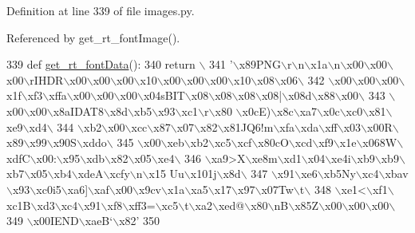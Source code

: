 Definition at line 339 of file images.\+py.



Referenced by get\+\_\+rt\+\_\+font\+Image().


\begin{DoxyCode}
339 \textcolor{keyword}{def }\hyperlink{namespaceimages_a1b911d4fa04b4af968ec1adc8d82e9f1}{get\_rt\_fontData}():
340     \textcolor{keywordflow}{return} \(\backslash\)
341 \textcolor{stringliteral}{'\(\backslash\)x89PNG\(\backslash\)r\(\backslash\)n\(\backslash\)x1a\(\backslash\)n\(\backslash\)x00\(\backslash\)x00\(\backslash\)x00\(\backslash\)rIHDR\(\backslash\)x00\(\backslash\)x00\(\backslash\)x00\(\backslash\)x10\(\backslash\)x00\(\backslash\)x00\(\backslash\)x00\(\backslash\)x10\(\backslash\)x08\(\backslash\)x06\(\backslash\)}
342 \textcolor{stringliteral}{\(\backslash\)x00\(\backslash\)x00\(\backslash\)x00\(\backslash\)x1f\(\backslash\)xf3\(\backslash\)xffa\(\backslash\)x00\(\backslash\)x00\(\backslash\)x00\(\backslash\)x04sBIT\(\backslash\)x08\(\backslash\)x08\(\backslash\)x08\(\backslash\)x08|\(\backslash\)x08d\(\backslash\)x88\(\backslash\)x00\(\backslash\)}
343 \textcolor{stringliteral}{\(\backslash\)x00\(\backslash\)x00\(\backslash\)x8aIDAT8\(\backslash\)x8d\(\backslash\)xb5\(\backslash\)x93\(\backslash\)xc1\(\backslash\)r\(\backslash\)x80 \(\backslash\)x0cE)\(\backslash\)x8c\(\backslash\)xa7\(\backslash\)x0c\(\backslash\)xc0\(\backslash\)x81\(\backslash\)xe9\(\backslash\)xd4\(\backslash\)}
344 \textcolor{stringliteral}{\(\backslash\)xb2\(\backslash\)x00\(\backslash\)xcc\(\backslash\)x87\(\backslash\)x07\(\backslash\)x82\(\backslash\)x81JQ$6!$m\(\backslash\)xfa\(\backslash\)xda\(\backslash\)xff\(\backslash\)x03\(\backslash\)x00R\(\backslash\)x89\(\backslash\)x99\(\backslash\)x90S\(\backslash\)xddo\(\backslash\)}
345 \textcolor{stringliteral}{\(\backslash\)x00\(\backslash\)xeb\(\backslash\)xb2\(\backslash\)xc5\(\backslash\)xcf\(\backslash\)x80cO\(\backslash\)xcd\(\backslash\)xf9\(\backslash\)x1e\(\backslash\)x068W\(\backslash\)xdfC\(\backslash\)x00:\(\backslash\)x95\(\backslash\)xdb\(\backslash\)x82\(\backslash\)x05\(\backslash\)xe4\(\backslash\)}
346 \textcolor{stringliteral}{\(\backslash\)xa9>X\(\backslash\)xe8m\(\backslash\)xd1\(\backslash\)x04\(\backslash\)xe4i\(\backslash\)xb9\(\backslash\)xb9\(\backslash\)xb7\(\backslash\)x05\(\backslash\)xb4\(\backslash\)xdeA\(\backslash\)xcfy\(\backslash\)n\(\backslash\)x15 Uu\(\backslash\)x101j\(\backslash\)x8d\(\backslash\)}
347 \textcolor{stringliteral}{\(\backslash\)x91\(\backslash\)xe6\(\backslash\)xb5Ny\(\backslash\)xc4\(\backslash\)xbav\(\backslash\)x93\(\backslash\)xc0i5\(\backslash\)xa6]\(\backslash\)xaf\(\backslash\)x00\(\backslash\)x9cv\(\backslash\)x1a\(\backslash\)xa5\(\backslash\)x17\(\backslash\)x97\(\backslash\)x07Tw\(\backslash\)t\(\backslash\)}
348 \textcolor{stringliteral}{\(\backslash\)xe1<\(\backslash\)xf1\(\backslash\)xc1B\(\backslash\)xd3\(\backslash\)xc4\(\backslash\)x91\(\backslash\)xf8\(\backslash\)xff3=\(\backslash\)xc5\(\backslash\)t\(\backslash\)xa2\(\backslash\)xed@\(\backslash\)x80\(\backslash\)nB\(\backslash\)x85Z\(\backslash\)x00\(\backslash\)x00\(\backslash\)x00\(\backslash\)}
349 \textcolor{stringliteral}{\(\backslash\)x00IEND\(\backslash\)xaeB`\(\backslash\)x82'}
350 
\end{DoxyCode}
